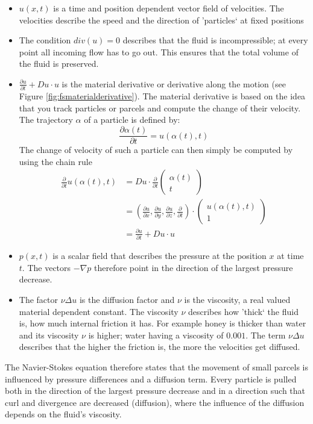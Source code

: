 \begin{itemize}
	\item $u(x,t)$ is a time and position dependent vector field of velocities. The velocities describe the speed and the direction of 'particles` at fixed positions
	\item The condition $div(u) = 0$ describes that the fluid is incompressible; at every point all incoming flow has to go out. This ensures that the total volume of the fluid is preserved.
	\item $\frac{\partial u}{\partial t} + D u \cdot u$ is the material derivative or derivative along the motion (see Figure \ref{fig:fsmaterialderivative}). The material derivative is based on the idea that you track particles or parcels and compute the change of their velocity. The trajectory $\alpha$ of a particle is defined by:
\[\frac{\partial \alpha(t)}{\partial t} = u(\alpha(t), t)\]
The change of velocity of such a particle can then simply be computed by using the chain rule  
\begin{align*}\frac{\partial}{\partial t} u(\alpha(t),t) &= Du \cdot \frac{\partial}{\partial t}\begin{pmatrix}
\alpha(t) \\
t
\end{pmatrix}\\
&= (\frac{\partial u}{\partial x}, \frac{\partial u}{\partial y},\frac{\partial u}{\partial z}, \frac{\partial }{\partial t}) \cdot \begin{pmatrix}
u(\alpha(t),t) \\
1
\end{pmatrix} \\
&= \frac{\partial u}{\partial t} + Du \cdot u
\end{align*}
\item $p(x,t)$ is a scalar field that describes the pressure at the position $x$ at time $t$. The vectors $-\nabla p$ therefore point in the direction of the largest pressure decrease.
\item The factor $\nu \Delta u$ is the diffusion factor and $\nu$ is the viscosity, a real valued material dependent constant. The viscosity $\nu$ describes how 'thick` the fluid is, how much internal friction it has. For example honey is thicker than water and its viscosity $\nu$ is higher; water having a viscosity of $0.001$. The term $\nu \Delta u$ describes that the higher the friction is, the more the velocities get diffused.
\end{itemize}

The Navier-Stokes equation therefore states that the movement of small parcels is influenced by pressure differences and a diffusion term. Every particle is pulled both in the direction of the largest pressure decrease and in a direction such that curl and divergence are decreased (diffusion), where the influence of the diffusion depends on the fluid's viscosity.

